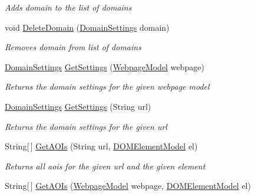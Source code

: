 \begin{DoxyCompactItemize}
\begin{DoxyCompactList}\small\item\em Adds domain to the list of domains \end{DoxyCompactList}\item 
void \hyperlink{class_web_analyzer_1_1_models_1_1_settings_model_1_1_experiment_settings_aae6124a9d932400b4430ee4c0bd226f7}{Delete\+Domain} (\hyperlink{class_web_analyzer_1_1_models_1_1_settings_model_1_1_domain_settings}{Domain\+Settings} domain)
\begin{DoxyCompactList}\small\item\em Removes domain from list of domains \end{DoxyCompactList}\item 
\hyperlink{class_web_analyzer_1_1_models_1_1_settings_model_1_1_domain_settings}{Domain\+Settings} \hyperlink{class_web_analyzer_1_1_models_1_1_settings_model_1_1_experiment_settings_a8c574eb50eb580ad4bc990456215e6d0}{Get\+Settings} (\hyperlink{class_web_analyzer_1_1_models_1_1_data_model_1_1_webpage_model}{Webpage\+Model} webpage)
\begin{DoxyCompactList}\small\item\em Returns the domain settings for the given webpage model \end{DoxyCompactList}\item 
\hyperlink{class_web_analyzer_1_1_models_1_1_settings_model_1_1_domain_settings}{Domain\+Settings} \hyperlink{class_web_analyzer_1_1_models_1_1_settings_model_1_1_experiment_settings_a26caccee1fb4f572addc15c90e07feb4}{Get\+Settings} (String url)
\begin{DoxyCompactList}\small\item\em Returns the domain settings for the given url \end{DoxyCompactList}\item 
String\mbox{[}$\,$\mbox{]} \hyperlink{class_web_analyzer_1_1_models_1_1_settings_model_1_1_experiment_settings_a2fdbe523bf5bc6cd721d10090f1d01b2}{Get\+A\+O\+Is} (String url, \hyperlink{class_web_analyzer_1_1_models_1_1_data_model_1_1_d_o_m_element_model}{D\+O\+M\+Element\+Model} el)
\begin{DoxyCompactList}\small\item\em Returns all aois for the given url and the given element \end{DoxyCompactList}\item 
String\mbox{[}$\,$\mbox{]} \hyperlink{class_web_analyzer_1_1_models_1_1_settings_model_1_1_experiment_settings_ab0b4dc8d742e0821d088adc78b980795}{Get\+A\+O\+Is} (\hyperlink{class_web_analyzer_1_1_models_1_1_data_model_1_1_webpage_model}{Webpage\+Model} webpage, \hyperlink{class_web_analyzer_1_1_models_1_1_data_model_1_1_d_o_m_element_model}{D\+O\+M\+Element\+Model} el)

\end{DoxyCompactItemize}
